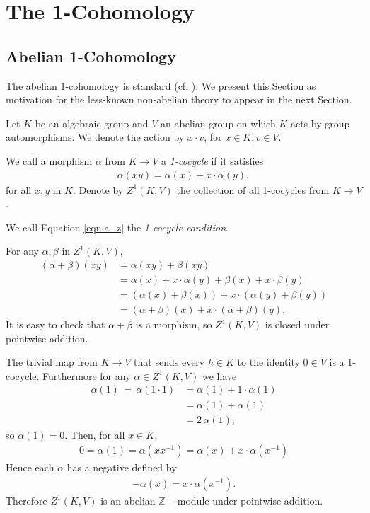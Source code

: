 
\chapter{The 1-Cohomology}
\label{Chapter3}

\section{Abelian 1-Cohomology}
The abelian 1-cohomology is standard (cf. \cite{brown1976cohomology}). We present this Section as motivation for the less-known non-abelian theory to appear in the next Section.

Let $K$ be an algebraic group and $V$ an abelian group on which $K$ acts by group automorphisms. We denote the action by $x \cdot v$, for $x \in K, v \in V$.

\begin{definition} We call a morphism $\alpha$ from $K\rightarrow V$ a \emph{1-cocycle} if it satisfies
	\begin{align}
		\alpha(xy) = \alpha(x) + x\cdot\alpha(y),
		\label{eqn:a_z}
	\end{align}
	for all $x, y$ in $K$. Denote by $Z^1\left( K, V \right)$ the collection of all 1-cocycles from $K\rightarrow V$.

	We call Equation \ref{eqn:a_z} the \emph{1-cocycle condition}.
\end{definition}

For any $\alpha, \beta$ in $Z^1\left(K, V\right)$,
\begin{align*}
	\left(\alpha + \beta\right)(xy) &=  \alpha(xy) +  \beta(xy) \\
	&=  \alpha(x) + x\cdot\alpha(y) +  \beta(x) + x\cdot\beta(y)\\
	&=  \left( \alpha(x) + \beta(x) \right) + x\cdot\left(\alpha(y) + \beta(y)\right) \\
	&=  \left(\alpha+\beta\right)(x) + x\cdot\left(\alpha + \beta\right)(y).
\end{align*}
It is easy to check that $\alpha + \beta$ is a morphism, so $Z^1(K, V)$ is closed under pointwise addition.

The trivial map from $K \rightarrow V$ that sends every $h \in K$ to the identity $0 \in V$ is a 1-cocycle. Furthermore for any $\alpha \in Z^1(K, V)$ we have
\begin{align*}
	\alpha(1)\, =\, \alpha(1\cdot 1) &=  \alpha(1) + 1\cdot \alpha(1) \\
	&=  \alpha(1) + \alpha(1) \\
	&=  2\,\alpha(1),
\end{align*}
so $\alpha(1) = 0$. Then, for all $x \in K$,
\begin{align*}
	0 = \alpha(1) = \alpha(xx^{-1}) = \alpha(x) + x \cdot \alpha(x^{-1})
\end{align*}
Hence each $\alpha$ has a negative defined by
\begin{align*}
	-\alpha(x) = x\cdot\alpha(x^{-1}).
\end{align*}
Therefore $Z^1\left(K, V\right)$ is an abelian $\mathbb{Z}-$module under pointwise addition.

